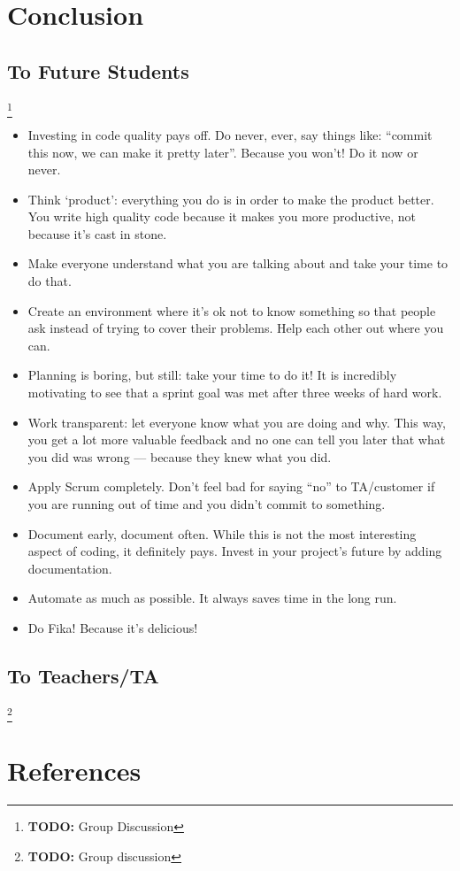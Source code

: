 \documentclass[11pt,a4paper]{report}
\newcommand{\todo}[1]{\footnote{{\color{red} {\bf TODO:} #1}}}
\begin{document}
\chapter{Conclusion}
\section*{To Future Students}
\todo{Group Discussion}
\begin{itemize}
\item  Investing in code quality pays off. Do never, ever, say things like:
``commit this now, we can make it pretty later''. Because you won't!
Do it now or never.
\item Think `product': everything you do is in order to make the product better.
You write high quality code because it makes you more productive, not because
it's cast in stone.
\item Make everyone understand what you are talking about and take your time to
do that.
\item Create an environment where it's ok not to know something so that people
ask instead of trying to cover their problems. Help each other out where you
can.
\item Planning is boring, but still: take your time to do it! It is incredibly
motivating to see that a sprint goal was met after three weeks of hard work.
\item Work transparent: let everyone know what you are doing and why. This way,
you get a lot more valuable feedback and no one can tell you later that what you
did was wrong --- because they knew what you did.
\item Apply Scrum completely. Don't feel bad for saying ``no'' to TA/customer if
you are running out of time and you didn't commit to something.
\item Document early, document often. While this is not the most interesting aspect
of coding, it definitely pays. Invest in your project's future by adding documentation.
\item Automate as much as possible. It always saves time in the long run.
\item Do Fika! Because it's delicious!
\end{itemize}
\section*{To Teachers/TA}
\todo{Group discussion}

\chapter{References}
\end{document}

